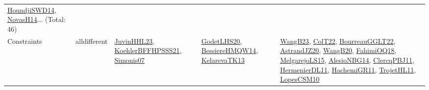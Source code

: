 {\begin{longtable}{lp{3cm}>{\raggedright}p{6cm}>{\raggedright}p{6cm}p{8cm}}
\href{papers/HoundjiSWD14.pdf}{HoundjiSWD14}\cite{HoundjiSWD14}, \href{articles/NovasH14.pdf}{NovasH14}\cite{NovasH14}... (Total: 46)\\
Constraints & alldifferent & \href{papers/JuvinHHL23.pdf}{JuvinHHL23}\cite{JuvinHHL23}, \href{articles/KoehlerBFFHPSSS21.pdf}{KoehlerBFFHPSSS21}\cite{KoehlerBFFHPSSS21}, \href{articles/Simonis07.pdf}{Simonis07}\cite{Simonis07} & \href{papers/GodetLHS20.pdf}{GodetLHS20}\cite{GodetLHS20}, \href{papers/BessiereHMQW14.pdf}{BessiereHMQW14}\cite{BessiereHMQW14}, \href{papers/KelarevaTK13.pdf}{KelarevaTK13}\cite{KelarevaTK13} & \href{papers/WangB23.pdf}{WangB23}\cite{WangB23}, \href{articles/ColT22.pdf}{ColT22}\cite{ColT22}, \href{articles/BourreauGGLT22.pdf}{BourreauGGLT22}\cite{BourreauGGLT22}, \href{articles/AstrandJZ20.pdf}{AstrandJZ20}\cite{AstrandJZ20}, \href{papers/WangB20.pdf}{WangB20}\cite{WangB20}, \href{articles/FahimiOQ18.pdf}{FahimiOQ18}\cite{FahimiOQ18}, \href{papers/MelgarejoLS15.pdf}{MelgarejoLS15}\cite{MelgarejoLS15}, \href{papers/AlesioNBG14.pdf}{AlesioNBG14}\cite{AlesioNBG14}, \href{papers/ClercqPBJ11.pdf}{ClercqPBJ11}\cite{ClercqPBJ11}, \href{papers/HermenierDL11.pdf}{HermenierDL11}\cite{HermenierDL11}, \href{articles/HachemiGR11.pdf}{HachemiGR11}\cite{HachemiGR11}, \href{articles/TrojetHL11.pdf}{TrojetHL11}\cite{TrojetHL11}, \href{articles/LopesCSM10.pdf}{LopesCSM10}\cite{LopesCSM10}\\

\end{longtable}}
